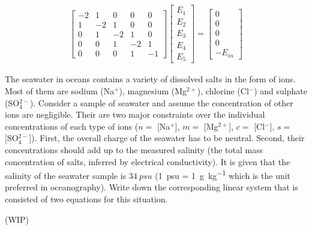 \begin{solution}
\begin{align*}
\begin{bmatrix}
-2 & 1 & 0 & 0 & 0 \\
1 & -2 & 1 & 0 & 0 \\
0 & 1 & -2 & 1 & 0 \\
0 & 0 & 1 & -2 & 1 \\
0 & 0 & 0 & 1 & -1
\end{bmatrix}
\begin{bmatrix}
E_1 \\
E_2 \\
E_3 \\
E_4 \\
E_5
\end{bmatrix}
=
\begin{bmatrix}
0 \\
0 \\
0 \\
0 \\
-E_{in}
\end{bmatrix}
\end{align*}
\end{solution}

\begin{exmp}
The seawater in oceans contains a variety of dissolved salts in the form of ions. Most of them are sodium (Na$^+$), magnesium (Mg$^{2+}$), chlorine (Cl$^-$) and sulphate (SO$_4^{2-}$). Consider a sample of seawater and assume the concentration of other ions are negligible. Their are two major constraints over the individual concentrations of each type of ions ($n=$ [Na$^+$], $m=$ [Mg$^{2+}$], $c=$ [Cl$^-$], $s=$ [SO$_4^{2-}$]). First, the overall charge of the seawater has to be neutral. Second, their concentrations should add up to the measured salinity (the total mass concentration of salts, inferred by electrical conductivity). It is given that the salinity of the seawater sample is $\SI{34}{psu}$ (\SI{1}{psu} = \SI{1}{\g\per\kg} which is the unit preferred in oceanography). Write down the corresponding linear system that is consisted of two equations for this situation.
\end{exmp}

(WIP)


